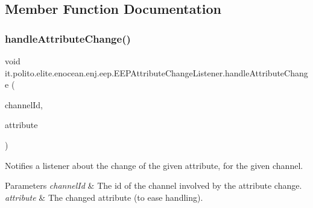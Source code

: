 \subsection{Member Function Documentation}
\hypertarget{interfaceit_1_1polito_1_1elite_1_1enocean_1_1enj_1_1eep_1_1_e_e_p_attribute_change_listener_a8ed543f4de048252dfd133116d488382}{}\label{interfaceit_1_1polito_1_1elite_1_1enocean_1_1enj_1_1eep_1_1_e_e_p_attribute_change_listener_a8ed543f4de048252dfd133116d488382} 
\subsubsection{\texorpdfstring{handle\+Attribute\+Change()}{handleAttributeChange()}}
{\footnotesize\ttfamily void it.\+polito.\+elite.\+enocean.\+enj.\+eep.\+E\+E\+P\+Attribute\+Change\+Listener.\+handle\+Attribute\+Change (\begin{DoxyParamCaption}\item[{int}]{channel\+Id,  }\item[{\hyperlink{classit_1_1polito_1_1elite_1_1enocean_1_1enj_1_1eep_1_1_e_e_p_attribute}{E\+E\+P\+Attribute}$<$?$>$}]{attribute }\end{DoxyParamCaption})}

Notifies a listener about the change of the given attribute, for the given channel. 
\begin{DoxyParams}{Parameters}
{\em channel\+Id} & The id of the channel involved by the attribute change. \\
\hline
{\em attribute} & The changed attribute (to ease handling). \\
\hline
\end{DoxyParams}


